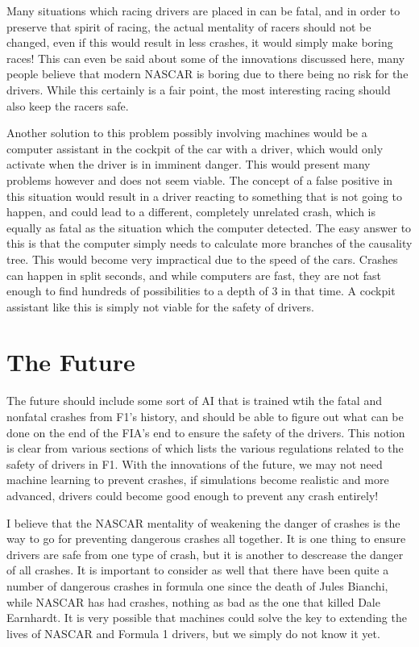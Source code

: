 \documentclass[letterpaper, 12pt]{article}
\numberwithin{figure}{section}
\begin{document}
Many situations which racing drivers are placed in can be fatal, and in order to preserve that spirit of racing, the actual mentality of racers should not be changed, even if this would result in less crashes, it would simply make boring races! This can even be said about some of the innovations discussed here, many people believe that modern NASCAR is boring due to there being no risk for the drivers. While this certainly is a fair point, the most interesting racing should also keep the racers safe.

Another solution to this problem possibly involving machines would be a computer assistant in the cockpit of the car with a driver, which would only activate when the driver is in imminent danger. This would present many problems however and does not seem viable. The concept of a false positive in this situation would result in a driver reacting to something that is not going to happen, and could lead to a different, completely unrelated crash, which is equally as fatal as the situation which the computer detected. The easy answer to this is that the computer simply needs to calculate more branches of the causality tree. This would become very impractical due to the speed of the cars. Crashes can happen in split seconds, and while computers are fast, they are not fast enough to find hundreds of possibilities to a depth of 3 in that time. A cockpit assistant like this is simply not viable for the safety of drivers.

\section{The Future}
The future should include some sort of AI that is trained wtih the fatal and nonfatal crashes from F1's history, and should be able to figure out what can be done on the end of the FIA's end to ensure the safety of the drivers. This notion is clear from various sections of \cite{fia2021} which lists the various regulations related to the safety of drivers in F1. With the innovations of the future, we may not need machine learning to prevent crashes, if simulations become realistic and more advanced, drivers could become good enough to prevent any crash entirely!

I believe that the NASCAR mentality of weakening the danger of crashes is the way to go for preventing dangerous crashes all together. It is one thing to ensure drivers are safe from one type of crash, but it is another to descrease the danger of all crashes. It is important to consider as well that there have been quite a number of dangerous crashes in formula one since the death of Jules Bianchi, while NASCAR has had crashes, nothing as bad as the one that killed Dale Earnhardt. It is very possible that machines could solve the key to extending the lives of NASCAR and Formula 1 drivers, but we simply do not know it yet. 
\newpage


\end{document}

